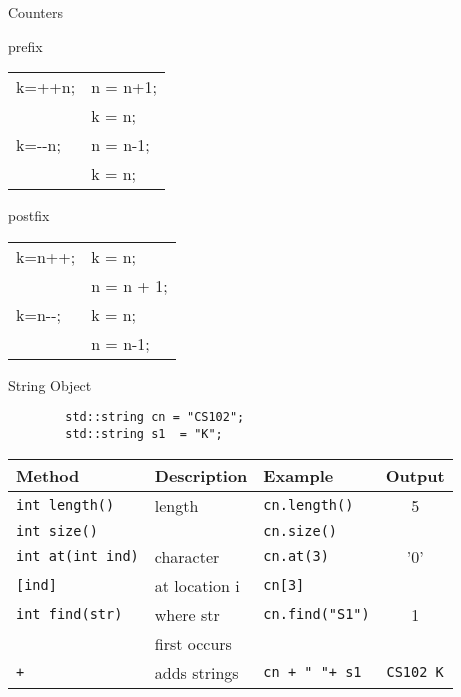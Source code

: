 \documentclass[xcolor={dvipsnames}]{beamer}
\begin{document}
\begin{frame}[fragile]{Counters}
	\center
\begin{block}{prefix}
	\begin{tabularx}{\textwidth}{| X | X |}
		\hline
		k=++n;& n = n+1; \\
			   & k = n;\\
		\hline
		k=$\text{-}\text{-}$n; &  n = n-1;\\
			&  k = n;\\
		\hline
	\end{tabularx}	
\end{block}
\begin{block}{postfix}
	\begin{tabularx}{\textwidth}{| X | X |}
		\hline
		k=n++; & k = n; \\
			   & n = n + 1;\\
		\hline
		k=n$\text{-}\text{-}$; & k = n;\\
					     &  n = n-1;\\
		\hline
	\end{tabularx}
\end{block}
\end{frame}

\begin{frame}[fragile]{String Object}
		\huge
		\begin{verbatim}
		std::string cn = "CS102";
		std::string s1  = "K";
		\end{verbatim}
	\normalsize 

	\begin{tabular}{| l| l | l | c |}
		\hline
		 \textbf{Method}& \textbf{Description} & \textbf{Example} & \textbf{Output}\\

		\hline
		\texttt{int length()} & length & \texttt{cn.length()} & 5\\
		\texttt{int size()} &  & \texttt{cn.size()} & \\
		\hline
		\texttt{int at(int ind)} & character & \texttt{cn.at(3)} & '0'\\
		\texttt{[ind]}&  at location i & \texttt{cn[3]}  &\\

		\hline
		\texttt{int find(str)} & where str & \texttt{cn.find("S1")} & 1\\
					& first occurs& &\\
		\hline
		\texttt{+} & adds strings & \texttt{cn + " "+ s1} & \texttt{CS102 K}\\
		\hline
	\end{tabular}
\end{frame}
\end{document}
